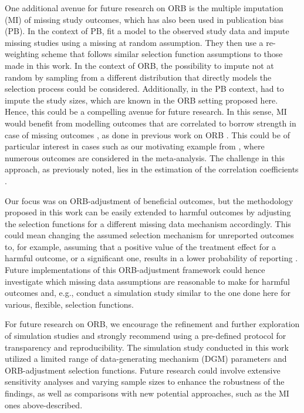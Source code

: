 \documentclass[twocolumn]{article}\usepackage[]{graphicx}\usepackage[]{xcolor}
\providecommand{\DIFaddtex}[1]{{\protect\color{blue}\uwave{#1}}} %
\providecommand{\DIFaddbegin}{} %
\providecommand{\DIFaddend}{} %
\providecommand{\DIFadd}[1]{\texorpdfstring{\DIFaddtex{#1}}{#1}} %
\newcommand{\DIFaddincludegraphics}[2][]{{\color{blue}\fbox{\DIFOincludegraphics[#1]{#2}}}} %
\DeclareRobustCommand{\DIFaddbegin}{\DIFOaddbegin \let\includegraphics\DIFaddincludegraphics} %
\DeclareRobustCommand{\DIFaddend}{\DIFOaddend \let\includegraphics\DIFOincludegraphics} %
\begin{document}
One additional avenue for future research on ORB is the multiple imputation (MI) of missing study outcomes, which has also been used in publication bias (PB). In the context of PB, \citet{MI_PB_Carpenter2011} fit a model to the observed study data and impute missing studies using a missing at random \DIFaddbegin \DIFadd{(MAR) }\DIFaddend assumption. They then use a re-weighting scheme that follows similar selection function assumptions to those made in this work. In the context of ORB, the possibility to impute not at random by sampling from a different distribution that directly models the selection process could be considered. Additionally, in the PB context, \citet{MI_PB_Carpenter2011} had to impute the study sizes,  which are known in the ORB setting proposed here. Hence, this could be a compelling avenue for future research. In this sense, MI would benefit from modelling outcomes that are correlated to borrow strength in case of missing outcomes \citep{MI_PB_Carpenter2011}, as done in previous work on ORB \citep{Bay, Kirkham2012}. This could be of particular interest in cases such as our motivating example from \citet{Copas2019, topiramate}, where numerous outcomes are considered in the meta-analysis. The challenge in this approach, as previously noted, lies in the estimation of the correlation coefficients \citep{mythesis, Bay, Kirkham2012}.

Our focus was on ORB-adjustment of beneficial outcomes, but the methodology proposed in this work can be easily extended to harmful outcomes by adjusting the selection functions for a different missing data mechanism accordingly. This could mean changing the assumed selection mechanism for unreported outcomes to, for example, assuming that a positive value of the treatment effect for a harmful outcome, or a significant one, results in a lower probability of reporting \citep{Copas2019, Copas2014, ORBIT_paper}. Future implementations of this ORB-adjustment framework could hence investigate which missing data assumptions are reasonable to make for harmful outcomes and, e.g., conduct a simulation study similar to the one done here for various, flexible, selection functions.

For future research on ORB, we encourage the refinement and further exploration of simulation studies and strongly recommend using a pre-defined protocol for transparency and reproducibility. The simulation study conducted in this work utilized a limited range of data-generating mechanism (DGM) parameters and ORB-adjustment selection functions. Future research could involve extensive sensitivity analyses and varying sample sizes to enhance the robustness of the findings, as well as comparisons with new potential approaches, such as the MI ones above-described.
\end{document}
